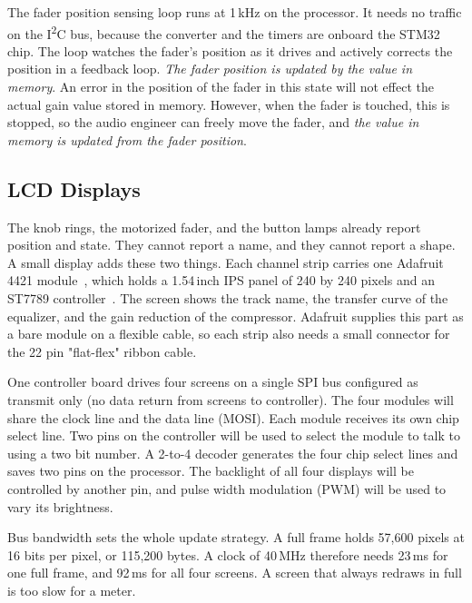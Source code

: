 \documentclass[11pt, letterpaper,titlepage]{article}
\begin{document}
The fader position sensing loop runs at 1\,kHz on the processor. It needs no traffic on the
I\textsuperscript{2}C bus, because the converter and the timers are onboard the STM32 chip. The loop watches the fader's position as it
drives and actively corrects the position in a feedback loop. \textit{The fader position is updated by the value in memory}. An error in the position of the fader in this state will not effect the actual gain value stored in memory. However, when the fader is touched, this is stopped, so the audio engineer can freely move the fader, and \textit{the value in memory is updated from the fader position}.





\subsection{LCD Displays}
\label{ssec:displays}

The knob rings, the motorized fader, and the button lamps already report
position and state. They cannot report a name, and they cannot report a shape.
A small display adds these two things. Each channel strip carries one Adafruit
4421 module~\cite{ada4421}, which holds a 1.54\,inch IPS panel of 240 by 240 pixels and an
ST7789 controller~\cite{st7789}. The screen shows the track name, the transfer curve of the
equalizer, and the gain reduction of the compressor. Adafruit supplies this
part as a bare module on a flexible cable, so each strip also needs a small
connector for the 22 pin "flat-flex" ribbon cable.

One controller board drives four screens on a single SPI bus configured as transmit only (no data return from screens to controller). The four modules will 
share the clock line and the data line (MOSI). Each module receives its own chip select line. Two pins on the controller will be used to select the module to talk to using a two bit number. A 2-to-4 decoder generates the four chip select lines and saves two pins on the processor. The backlight of all four displays will be controlled by another pin, and pulse width modulation (PWM) will be used to vary its brightness.

Bus bandwidth sets the whole update strategy. A full frame holds 57,600 pixels
at 16 bits per pixel, or 115,200 bytes. A clock of 40\,MHz therefore needs
23\,ms for one full frame, and 92\,ms for all four screens. A screen that always
redraws in full is too slow for a meter.
\end{document}
